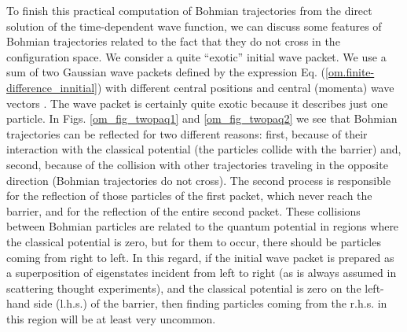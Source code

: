 \documentclass[onecolumn,nofootinbib, secnumarabic, amsmath, nobibnotes,12pt,aps,pra]{revtex4-1}
\newcommand{\eref}[1]{Eq. (\ref{#1})}
\begin{document}
To finish this practical computation of Bohmian trajectories from
the direct solution of the time-dependent wave function, we can
discuss some features of Bohmian trajectories related to the fact
that they do not cross in the configuration space. We consider a
quite ``exotic'' initial wave packet. We use a sum of two Gaussian
wave packets defined by the expression
\eref{om.finite-difference_innitial} with different central
positions and central (momenta) wave vectors \cite{om.oriolstime}.
The wave packet is certainly quite exotic because it describes just
one particle. In Figs. \ref{om_fig_twopaq1} and \ref{om_fig_twopaq2} we
see that Bohmian trajectories can be reflected for two different
reasons: first, because of their interaction with the classical
potential (the particles collide with the barrier) and, second,
because of the collision with other trajectories traveling in the
opposite direction (Bohmian trajectories do not cross). The second
process is responsible for the reflection of those particles of the
first packet, which never reach the barrier, and for the reflection
of the entire second packet. These collisions between Bohmian
particles are related to the quantum  potential
in regions where the classical potential is zero, but for them to
occur, there should be particles coming from right to left. In this
regard, if the initial wave packet is prepared as a superposition of
eigenstates incident from left to right (as is always assumed in
scattering thought experiments), and the classical potential is zero
on the left-hand side (l.h.s.) of the barrier, then finding
particles coming from the r.h.s. in this region will be at least
very uncommon.
\end{document}
